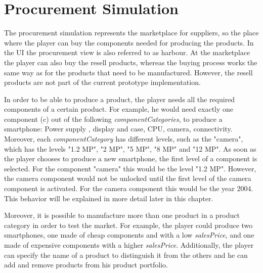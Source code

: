 \section{Procurement Simulation}
\label{procuresim}
The procurement simulation represents the marketplace for suppliers, so  the place where the player can buy the components needed for producing the products. In the UI the procurement view is also referred to as harbour. At the marketplace the player can also buy the resell products, whereas the buying process works the same way as for the products that need to be manufactured. However, the resell products are not part of the current prototype implementation.

In order to be able to produce a product, the player needs all the required components of a certain product. For example, he would need exactly one component (\gls{c}) out of the following \textit{componentCategories}, to produce a smartphone: Power supply , display and case, CPU, camera, connectivity. Moreover, each \textit{componentCategory} has different levels, such as the "camera", which has the levels "1.2 MP", "2 MP", "5 MP", "8 MP" and "12 MP".  As soon as the player chooses to produce a new smartphone, the first level of a component is selected. For the component "camera" this would be the level "1.2 MP". However, the camera component would not be unlocked until the first level of the camera component is activated. For the camera component this would be the year 2004. This behavior will be explained in more detail later in this chapter.

Moreover, it is possible to manufacture more than one product in a product category in order to test the market. For example, the player could produce two smartphones, one made of cheap components and with a low \textit{salesPrice}, and one made of expensive components with a higher \textit{salesPrice}. Additionally, the player can specify the name of a product to distinguish it from the others and he can add and remove products from his product portfolio.

